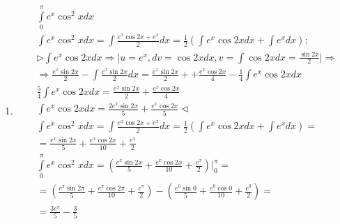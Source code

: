 \documentclass[a4paper, 12pt]{article}
\begin{document}
\begin{enumerate}
    \item %
    \begin{align*}
     &\int\limits_0^\pi e^x \cos^2x dx \\
     &\int e^x \cos^2x dx = \int \frac{e^x \cos2x + e^x}{2}dx = \frac{1}{2} (\int e^x\cos2xdx+\int e^xdx); \\
     &\rhd\int e^x\cos2xdx \Rightarrow 
     \Big|    u = e^x, dv = \cos2x dx, v = \int \cos2xdx = \frac{\sin2x}{2}
     \Big| \Rightarrow \\
     &\Rightarrow \frac{e^x \sin2x}{2} - \int \frac{e^x \sin2x}{2}dx =  \frac{e^x \sin2x}{2} + 
     + \frac{e^x \cos2x}{4}- \frac{1}{4} \int e^x \cos2xdx  \\
     &\frac{5}{4} \int e^x \cos2x dx = \frac{e^x \sin2x}{2} + \frac{e^x \cos2x}{4} \\
     &\int e^x \cos2x dx = \frac{2e^x \sin2x}{5} + \frac{e^x \cos2x}{5} \lhd \\
     &\int e^x \cos^2x dx = \int \frac{e^x \cos2x + e^x}{2}dx = \frac{1}{2} (\int e^x\cos2xdx+\int e^xdx)= \\
     &=\frac{e^x \sin2x}{5} + \frac{e^x \cos2x}{10} + \frac{e^x}{2}  \\
     &\int\limits_0^\pi e^x \cos^2x dx = (\frac{e^x \sin2x}{5} + \frac{e^x \cos2x}{10} + \frac{e^x}{2}) \Big |_0^\pi = \\
     &= (\frac{e^\pi \sin2\pi}{5} + \frac{e^\pi \cos2\pi}{10} + \frac{e^\pi}{2}) - (\frac{e^0 \sin0}{5} + \frac{e^0 \cos0}{10} + \frac{e^0}{2})=\\
     &= \frac{3 e^\pi}{5} - \frac{3}{5}
    \end{align*}
\end{enumerate}
\end{document}
